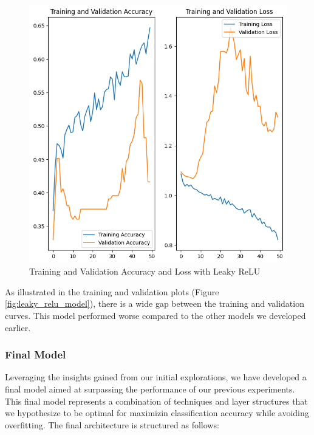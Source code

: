 \begin{figure}[H]
  \includegraphics[width=\linewidth]{figures/leaky_relu.png}
  \caption{Training and Validation Accuracy and Loss with Leaky ReLU}
  \label{fig:leaky_relu}
\end{figure}

As illustrated in the training and validation plots (Figure \ref{fig:leaky_relu_model}), there is a wide gap between the training and validation curves. This model performed worse compared to the other models we developed earlier.

\subsubsection{Final Model}

Leveraging the insights gained from our initial explorations, we have developed a final model aimed at surpassing the performance of our previous experiments. This final model represents a combination  of techniques and layer structures that we hypothesize to be optimal for maximizin classification accuracy while avoiding overfitting. The final architecture is structured as follows:

